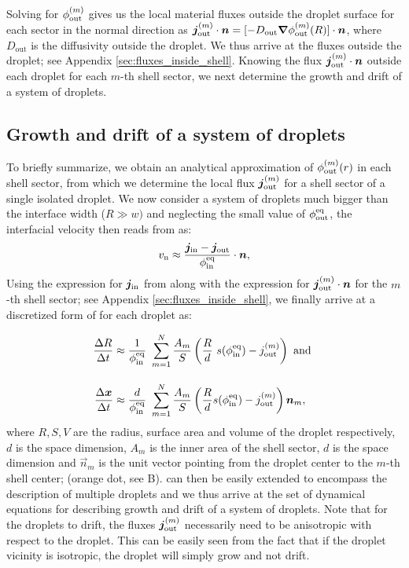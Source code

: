Solving for $\phi_\mathrm{out}^{(m)}$ gives us the local material fluxes outside the droplet surface for each sector in the normal direction as $\boldsymbol{j}_\mathrm{out}^{(m)} \cdot \boldsymbol{n} = [-D_\mathrm{out} {\boldsymbol{\nabla}} \phi_\mathrm{out}^{(m)}(R)] \cdot \boldsymbol{n} $, where $D_\mathrm{out}$ is the diffusivity outside the droplet.
We thus arrive at the fluxes outside the droplet; see Appendix \ref{sec:fluxes_inside_shell}.
Knowing the flux $\boldsymbol{j}_\mathrm{out}^{(m)} \cdot \boldsymbol{n}$ outside each droplet for each $m$-th shell sector, we next determine the growth and drift of a system of droplets.

\subsection{Growth and drift of a system of droplets}

To briefly summarize, we obtain an analytical approximation of $\phi_\mathrm{out}^{(m)}(r)$ in each shell sector, from which we determine the local flux $\boldsymbol{j}_\mathrm{out}^{(m)}$ for a shell sector of a single isolated droplet.
We now consider a system of droplets much bigger than the interface width ($R \gg w)$ and neglecting the small value of $\phi^\mathrm{eq}_\mathrm{out}$, the interfacial velocity then reads from  as:
\begin{equation*}
    v_\mathrm{n} \approx \frac{\boldsymbol{j}_\mathrm{in} - \boldsymbol{j}_\mathrm{out}}{\phi^\mathrm{eq}_\mathrm{in}} \cdot \boldsymbol{n},
\end{equation*}
Using the expression for $\boldsymbol{j}_\mathrm{in}$ from  along with the expression for $\boldsymbol{j}_\mathrm{out}^{(m)} \cdot \boldsymbol{n}$ for the $m$-th shell sector; see Appendix \ref{sec:fluxes_inside_shell}, we finally arrive at a discretized form of  for each droplet as:

\begin{subequations} 
\label{eqn:DropletDiscretized}
\begin{align}
    \frac{\Delta R}{\Delta t} &\approx \frac{1}{\phi^\mathrm{eq}_\mathrm{in}}~\sum_{m=1}^{N} \frac{A_m}{S}\left ( \frac{R}{d}~s(\phi^\mathrm{eq}_\mathrm{in})  -  {j}^{(m)}_\mathrm{out}  \right)
    \mathrm{~and~}
    \\[10pt]
    \frac{\Delta \boldsymbol{x}}{\Delta t} &\approx \frac{d}{\phi^\mathrm{eq}_\mathrm{in}}~\sum_{m=1}^{N} \frac{A_m}{S} \left ( \frac{R}{d}s(\phi^\mathrm{eq}_\mathrm{in})  -  {j}^{(m)}_\mathrm{out}\right) \boldsymbol{n}_m,
\end{align}
\end{subequations}
where $R, S, V$ are the radius, surface area and volume of the droplet respectively, $d$ is the space dimension, $A_m$ is the inner area of the shell sector, $d$ is the space dimension and $\vec{n}_m$ is the unit vector pointing from the droplet center to the $m$-th shell center; (orange dot, see B).
 can then be easily extended to encompass the description of multiple droplets and we thus arrive at the set of dynamical equations for describing growth and drift of a system of droplets.
Note that for the droplets to drift, the fluxes $\boldsymbol{j}_\mathrm{out}^{(m)}$ necessarily need to be anisotropic with respect to the droplet.
This can be easily seen from the fact that if the droplet vicinity is isotropic, the droplet will simply grow and not drift. 

